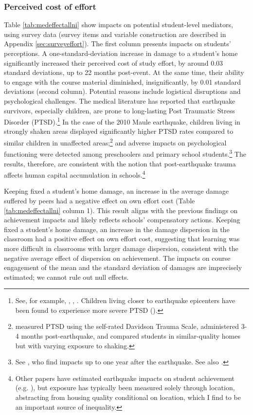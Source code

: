 \subsubsection{Perceived cost of effort}

Table \ref{tab:medeffectallni} show impacts on potential student-level mediators, using survey data (survey items and variable construction are described in Appendix \ref{sec:surveyeffort}). The first column presents impacts on students' perceptions. A one-standard-deviation increase in damage to a student's home significantly increased their perceived cost of study effort, by around 0.03 standard deviations, up to 22 months post-event. At the same time, their ability to engage with the course material diminished, insignificantly, by 0.01 standard deviations (second column). Potential reasons include logistical disruptions and psychological challenges. The medical literature has reported that earthquake survivors, especially children, are prone to long-lasting Post Traumatic Stress Disorder (PTSD).\footnote{See, for example, \cite{altindag2005one}, \cite{lui2009high}, \cite{giannopoulou2006post}. Children living closer to earthquake epicenters have been found to experience more severe PTSD (\cite{groome2004post}).} In the case of the 2010 Maule earthquake, children living in strongly shaken areas displayed significantly higher PTSD rates compared to similar children in unaffected areas;\footnote{\cite{zubizarreta2013effect} measured PTSD using the self-rated Davidson Trauma Scale, administered 3-4 months post-earthquake, and compared students in similar-quality homes but with varying exposure to shaking.} and adverse impacts on psychological functioning were detected among preschoolers and primary school students.\footnote{See \cite{dutta2022earthquake}, who find impacts up to one year after the earthquake. See also \cite{gomez2017earthquake}.} The results, therefore, are consistent with the notion that post-earthquake trauma affects human capital accumulation in schools.\footnote{Other papers have estimated earthquake impacts on student achievement (e.g. \cite{shidiqi2023earthquake}), but exposure has typically been measured solely through location, abstracting from housing quality conditional on location, which I find to be an important source of inequality.}\par
Keeping fixed a student's home damage, an increase in the average damage suffered by peers had a negative effect on own effort cost (Table \ref{tab:medeffectallni} column 1). This result aligns with the previous findings on achievement impacts and likely reflects schools' compensatory actions. Keeping fixed a student's home damage, an increase in the damage dispersion in the classroom had a positive effect on own effort cost, suggesting that learning was more difficult in classrooms with larger damage dispersion, consistent with the negative average effect of dispersion on achievement. The impacts on course engagement of the mean and the standard deviation of damages are imprecisely estimated; we cannot rule out null effects.\par 
  







